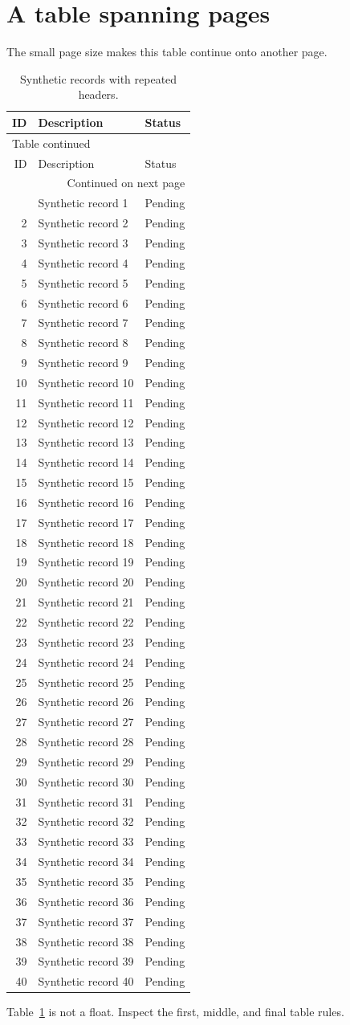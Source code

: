 \documentclass{article}
\newcommand{\testrow}[1]{#1 & Synthetic record #1 & Pending\\}
\begin{document}
\section{A table spanning pages}
The small page size makes this table continue onto another page.
\begin{longtable}{rll}
\caption{Synthetic records with repeated headers.}\label{tab:long}\\
\toprule ID & Description & Status\\\midrule
\endfirsthead
\multicolumn{3}{l}{\small Table \thetable{} continued}\\
\toprule ID & Description & Status\\\midrule
\endhead
\midrule\multicolumn{3}{r}{\small Continued on next page}\\
\endfoot
\bottomrule
\endlastfoot
1 & Synthetic record 1 & Pending\\\testrow{2}\testrow{3}\testrow{4}\testrow{5}
\testrow{6}\testrow{7}\testrow{8}\testrow{9}\testrow{10}
\testrow{11}\testrow{12}\testrow{13}\testrow{14}\testrow{15}
\testrow{16}\testrow{17}\testrow{18}\testrow{19}\testrow{20}
\testrow{21}\testrow{22}\testrow{23}\testrow{24}\testrow{25}
\testrow{26}\testrow{27}\testrow{28}\testrow{29}\testrow{30}
\testrow{31}\testrow{32}\testrow{33}\testrow{34}\testrow{35}
\testrow{36}\testrow{37}\testrow{38}\testrow{39}\testrow{40}
\end{longtable}
Table~\ref{tab:long} is not a float. Inspect the first, middle, and final table rules.
\end{document}
